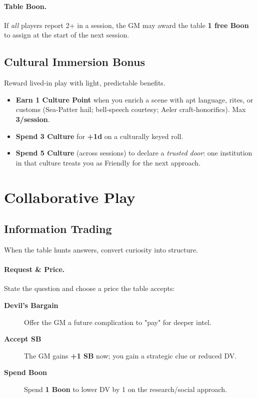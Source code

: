 \paragraph{Table Boon.} If \emph{all} players report 2+ in a session, the GM may award the table \textbf{1 free Boon} to assign at the start of the next session.

\subsection{Cultural Immersion Bonus}

Reward lived-in play with light, predictable benefits.
\begin{itemize}
  \item \textbf{Earn 1 Culture Point} when you enrich a scene with apt language, rites, or customs (Sea-Patter hail; bell-speech courtesy; Aeler craft-honorifics). Max \textbf{3/session}.%
  \item \textbf{Spend 3 Culture} for \textbf{+1d} on a culturally keyed roll.%
  \item \textbf{Spend 5 Culture} (across sessions) to declare a \emph{trusted door}: one institution in that culture treats you as Friendly for the next approach.%
\end{itemize}

\section{Collaborative Play}

\subsection{Information Trading}

When the table hunts answers, convert curiosity into structure.

\paragraph{Request \& Price.}
State the question and choose a price the table accepts:
\begin{description}
  \item[\textbf{Devil's Bargain}] Offer the GM a future complication to "pay" for deeper intel.%
  \item[\textbf{Accept SB}] The GM gains \textbf{+1 SB} now; you gain a strategic clue or reduced DV.%
  \item[\textbf{Spend Boon}] Spend \textbf{1 Boon} to lower DV by 1 on the research/social approach.%
\end{description}

